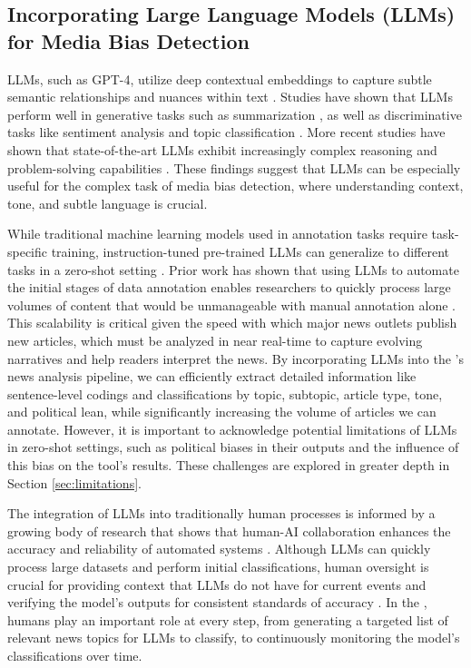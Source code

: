 \subsection{Incorporating Large Language Models (LLMs) for Media Bias Detection}
\label{sec:relate_work_llm_bias}

LLMs, such as GPT-4, utilize deep contextual embeddings to capture subtle semantic relationships and nuances within text \cite{brown2020language,achiam2023gpt, radford2019language}. Studies have shown that LLMs perform well in generative tasks such as summarization \cite{liu-etal-2024-learning, ravaut-etal-2024-context, liu2023learning}, as well as discriminative tasks like sentiment analysis and topic classification \cite{chang2024survey, pena2023leveraging, zhang2023sentiment}. More recent studies have shown that state-of-the-art LLMs exhibit increasingly complex reasoning and problem-solving capabilities \cite{bubeck2023sparks}. These findings suggest that LLMs can be especially useful for the complex task of media bias detection, where understanding context, tone, and subtle language is crucial.

While traditional machine learning models used in annotation tasks require task-specific training, instruction-tuned pre-trained LLMs can generalize to different tasks in a zero-shot setting \cite{wang_humanllm_2024}. Prior work has shown that using LLMs to automate the initial stages of data annotation enables researchers to quickly process large volumes of content that would be unmanageable with manual annotation alone \cite{ziems2024can}. This scalability is critical given the speed with which major news outlets publish new articles, which must be analyzed in near real-time to capture evolving narratives and help readers interpret the news. By incorporating LLMs into the \mbd's news analysis pipeline, we can efficiently extract detailed information like sentence-level codings and classifications by topic, subtopic, article type, tone, and political lean, while significantly increasing the volume of articles we can annotate. However, it is important to acknowledge potential limitations of LLMs in zero-shot settings, such as political biases in their outputs and the influence of this bias on the tool's results. These challenges are explored in greater depth in Section \ref{sec:limitations}.

The integration of LLMs into traditionally human processes is informed by a growing body of research that shows that human-AI collaboration enhances the accuracy and reliability of automated systems \cite{uchendu2023does, goel2023llms}. Although LLMs can quickly process large datasets and perform initial classifications, human oversight is crucial for providing context that LLMs do not have for current events and verifying the model's outputs for consistent standards of accuracy \cite{wang_humanllm_2024, amirizaniani2024developing}. In the \mbd, humans play an important role at every step, from generating a targeted list of relevant news topics for LLMs to classify, to continuously monitoring the model's classifications over time.

